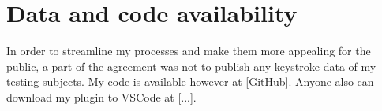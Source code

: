 \chapter{Data and code availability}
In order to streamline my processes and make them more appealing for the public, a part of the agreement was not to publish any keystroke data of my testing subjects. My code is available however at [GitHub]. Anyone also can download my plugin to VSCode at [...].
